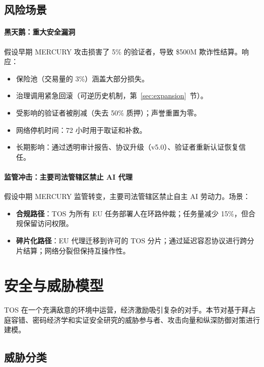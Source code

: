 \documentclass[11pt]{article}
\begin{document}
\subsection{风险场景}
\paragraph{黑天鹅：重大安全漏洞}
假设早期 MERCURY 攻击损害了 5\% 的验证者，导致 \$500M 欺诈性结算。响应：
\begin{itemize}[noitemsep]
  \item 保险池（交易量的 3\%）涵盖大部分损失。
  \item 治理调用紧急回滚（可逆历史机制，第~\ref{sec:expansion}~节）。
  \item 受影响的验证者被削减（失去 50\% 质押）；声誉重置为零。
  \item 网络停机时间：72 小时用于取证和补救。
  \item 长期影响：通过透明审计报告、协议升级（v5.0）、验证者重新认证恢复信任。
\end{itemize}

\paragraph{监管冲击：主要司法管辖区禁止 AI 代理}
假设中期 MERCURY 监管转变，主要司法管辖区禁止自主 AI 劳动力。场景：
\begin{itemize}[noitemsep]
  \item \textbf{合规路径}：TOS 为所有 EU 任务部署人在环路仲裁；任务量减少 15\%，但合规保留访问权限。
  \item \textbf{碎片化路径}：EU 代理迁移到许可的 TOS 分片；通过延迟容忍协议进行跨分片结算；网络分裂但保持互操作性。
\end{itemize}

\section{安全与威胁模型}
\label{sec:security}

TOS 在一个充满敌意的环境中运营，经济激励吸引复杂的对手。本节对基于拜占庭容错、密码经济学和实证安全研究的威胁参与者、攻击向量和纵深防御对策进行建模。

\subsection{威胁分类}
\end{document}
